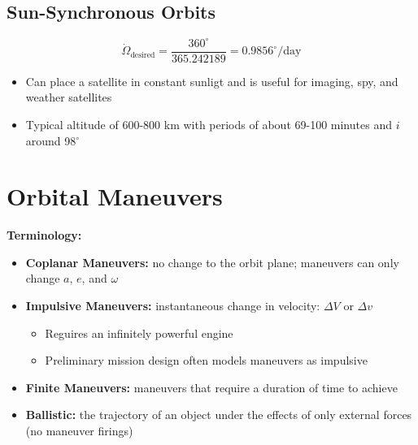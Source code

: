 \documentclass{article}
\begin{document}
\begin{multicols*}{3}
    \subsection*{Sun-Synchronous Orbits}
    $$\dot{\Omega}_{\text{desired}}=\frac{360^\circ}{365.242189}=0.9856^\circ/\text{day}$$
    \begin{itemize}
        \item Can place a satellite in constant sunligt and is useful for imaging, spy, and weather satellites
        \item Typical altitude of 600-800 km with periods of about 69-100 minutes and $i$ around 98$^\circ$
    \end{itemize}

    \section*{Orbital Maneuvers}
    \textbf{Terminology:}
    \begin{itemize}
        \item \textbf{Coplanar Maneuvers:} no change to the orbit plane; maneuvers can only change $a$, $e$, and $\omega$
        \item \textbf{Impulsive Maneuvers:} instantaneous change in velocity: $\Delta V$ or $\Delta v$
            \begin{itemize}
                \item Reguires an infinitely powerful engine
                \item Preliminary mission design often models maneuvers as impulsive
            \end{itemize}
        \item \textbf{Finite Maneuvers:} maneuvers that require a duration of time to achieve
        \item \textbf{Ballistic:} the trajectory of an object under the effects of only external forces (no maneuver firings)
    \end{itemize}

\end{multicols*}
\end{document}
